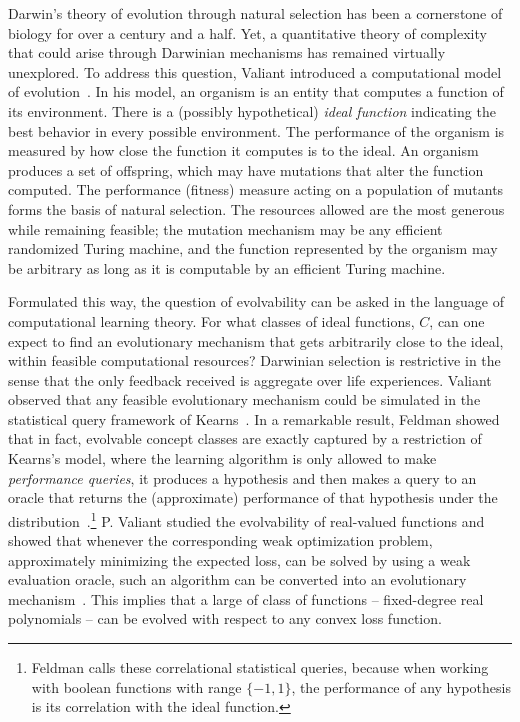 Darwin's theory of evolution through natural selection has been a cornerstone of
biology for over a century and a half. Yet, a quantitative theory of complexity
that could arise through Darwinian mechanisms has remained virtually unexplored.
To address this question, Valiant introduced a computational model of
evolution~\cite{Valiant:2009-evolvability}.  In his model, an organism is an
entity that computes a function of its environment.  There is a (possibly
hypothetical) \emph{ideal function} indicating the best behavior in every
possible environment. The performance of the organism is measured by how close
the function it computes is to the ideal. An organism produces a set of
offspring, which may have mutations that  alter the function computed. The
performance (fitness) measure acting on a population of mutants forms the basis
of natural selection. The resources allowed are the most generous while
remaining feasible; the mutation mechanism may be any efficient randomized
Turing machine, and the function represented by the organism may be arbitrary as
long as it is computable by an efficient Turing machine.

Formulated this way, the question of evolvability can be asked in the language
of computational learning theory. For what classes of ideal functions, $C$, can
one expect to find an evolutionary mechanism that gets arbitrarily close to the
ideal, within feasible computational resources? Darwinian selection is
restrictive in the sense that the only feedback received is aggregate over life
experiences. Valiant observed that any feasible evolutionary mechanism could be
simulated in the statistical query framework of Kearns~\cite{Kearns:1998}. In a
remarkable result, Feldman showed that in fact, evolvable concept classes are
exactly captured by a restriction of Kearns's model, where the learning
algorithm is only allowed to make \emph{performance queries}, \ie it produces a
hypothesis and then makes a query to an oracle that returns the (approximate)
performance of that hypothesis under the
distribution~\cite{Feldman:2008-evolvability}.\footnote{Feldman calls these
correlational statistical queries, because when working with boolean
functions with range $\{-1, 1\}$, the performance of any hypothesis is its
correlation with the ideal function.} P.  Valiant studied the evolvability of
real-valued functions and showed that whenever the corresponding weak
optimization problem, \ie approximately minimizing the expected loss, can be
solved by using a weak evaluation oracle, such an algorithm can be converted
into an evolutionary mechanism~\cite{Valiant:2012-real}. This implies that a
large of class of functions -- fixed-degree real polynomials -- can be evolved
with respect to any convex loss function.

